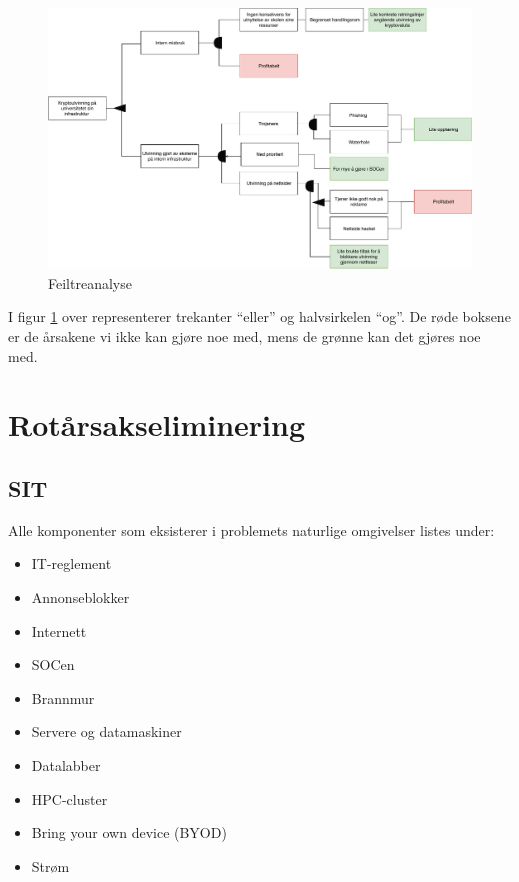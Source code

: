  \begin{figure}[H]
    \centering
    \includegraphics[scale=0.45]{case_3/bilder/feil_tre_analyse.pdf}
    \caption{Feiltreanalyse}
    \label{fig:feil_tre_analyse}
\end{figure}

I figur \ref{fig:feil_tre_analyse} over representerer trekanter ``eller'' og halvsirkelen ``og''. De røde boksene er de årsakene vi ikke kan gjøre noe med, mens de grønne kan det gjøres noe med.
\section{Rotårsakseliminering}
\subsection{SIT}
Alle komponenter som eksisterer i problemets naturlige omgivelser listes under:

\begin{itemize}
    \item IT-reglement
    \item Annonseblokker
    \item Internett
    \item SOCen
    \item Brannmur
    \item Servere og datamaskiner
    \item Datalabber
    \item HPC-cluster
    \item Bring your own device (BYOD)
    \item Strøm
\end{itemize}

